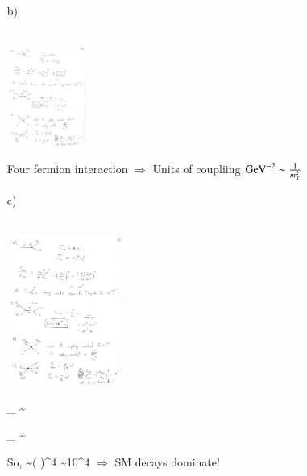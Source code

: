 {\begin{itemize}
\item[b)]{ ${ }$\\
\bc
\includegraphics[width=0.2\textwidth]{./eeDmDm.pdf}
\ec

Four fermion interaction $\Rightarrow$ Units of coupliing $\textrm{GeV}^{-2} \sim \frac{1}{m_X^2}$ 

}


\item[c)]{ ${ }$\\
\bc
\includegraphics[width=0.3\textwidth]{./muDecayX.pdf}
\ec

\be
\Gamma_{} \sim {} \hspace*{0.5in} 
\ee


\be
\Gamma_{} \sim {}  \hspace*{0.5in} 
\ee

So,
\be
{} \sim \left( \right)^4 \sim 10^4
\ee
$\Rightarrow$ SM decays dominate!
}

\end{itemize}



}
